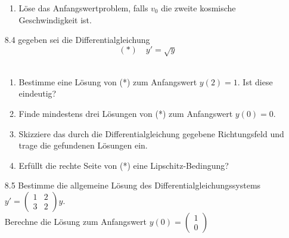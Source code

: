 \documentclass{HM}
\begin{document}
\begin{enumerate}
\begin{enumerate}
			\item Löse das Anfangswertproblem, falls $v_0$ die zweite kosmische Geschwindigkeit ist.
		\end{enumerate}
		
		\item[8.4] gegeben sei die Differentialgleichung\\
		$$(*)\quad y'=\sqrt{y}$$\\
		\begin{enumerate}
			\item Bestimme eine Lösung von (*) zum Anfangswert $y(2)=1.$ Ist diese eindeutig?
			
			\item Finde mindestens drei Lösungen von (*) zum Anfangswert $y(0)=0$.
			
			\item Skizziere das durch die Differentialgleichung gegebene Richtungsfeld und trage die gefundenen Lösungen ein.
			
			\item Erfüllt die rechte Seite von (*) eine Lipschitz-Bedingung?
		\end{enumerate}
		
		\item[8.5] Bestimme die allgemeine Lösung des Differentialgleichungssystems $y'=\begin{pmatrix}
			1&2\\
			3&2
		\end{pmatrix}y.$\\
		Berechne die Lösung zum Anfangswert $y(0)=\begin{pmatrix}
			1\\
			0
		\end{pmatrix}$
	\end{enumerate}
\end{document}
